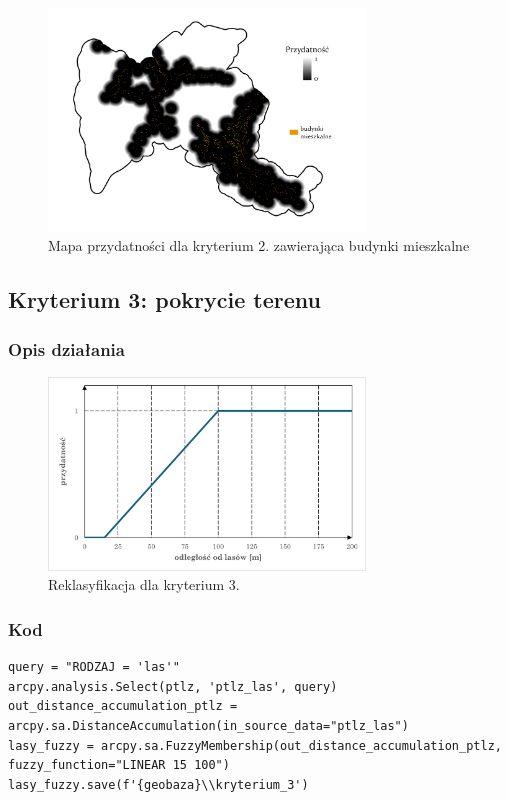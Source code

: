 \documentclass{article}
\begin{document}
\begin{figure}[H]
    \centering
    \includegraphics[width=0.75\textwidth]{img/kryterium2-budynki.jpg}
    \caption*{Mapa przydatności dla kryterium 2. zawierająca budynki mieszkalne}
\end{figure}


\newpage
\subsection{Kryterium 3: pokrycie terenu}
\subsubsection{Opis działania}
\begin{figure}[H]
    \centering
    \includegraphics[width=0.75\textwidth]{img/kryterium3-wykres-glowny.png}
    \caption*{Reklasyfikacja dla kryterium 3.}
\end{figure}

\subsubsection{Kod}
\begin{lstlisting}
query = "RODZAJ = 'las'"
arcpy.analysis.Select(ptlz, 'ptlz_las', query)
out_distance_accumulation_ptlz = arcpy.sa.DistanceAccumulation(in_source_data="ptlz_las")
lasy_fuzzy = arcpy.sa.FuzzyMembership(out_distance_accumulation_ptlz, fuzzy_function="LINEAR 15 100")
lasy_fuzzy.save(f'{geobaza}\\kryterium_3')
\end{lstlisting}
\end{document}
